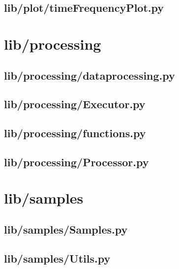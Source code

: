 \subsection*{lib/plot/timeFrequencyPlot.py}
\label{ap:timeFrequencyPlot}
\section{lib/processing}

\subsection*{lib/processing/dataprocessing.py}
\label{ap:dataprocessing}

\subsection*{lib/processing/Executor.py}
\label{ap:Executor}

\subsection*{lib/processing/functions.py}
\label{ap:functions}

\subsection*{lib/processing/Processor.py}
\label{ap:Processor}
\section{lib/samples}

\subsection*{lib/samples/Samples.py}
\label{ap:Samples}

\subsection*{lib/samples/Utils.py}
\label{ap:samples-Utils}
